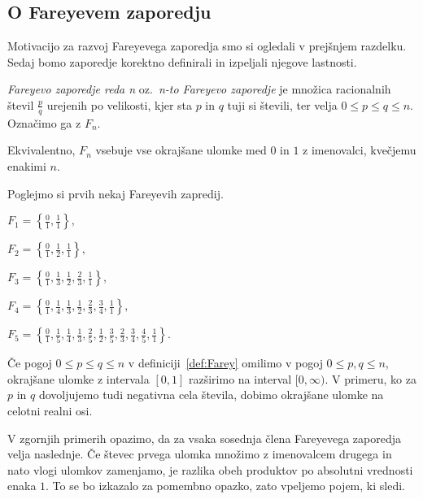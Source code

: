 \documentclass[mat1]{fmfdelo}
\begin{document}
%
\subsection{O Fareyevem zaporedju}

Motivacijo za razvoj Fareyevega zaporedja smo si ogledali v prejšnjem razdelku. Sedaj bomo zaporedje korektno definirali in izpeljali njegove lastnosti.

\begin{definicija}
\label{def:Farey}
\emph{Fareyevo zaporedje reda n} oz.\ \emph{n-to Fareyevo zaporedje} je množica racionalnih števil $\frac{p}{q}$ urejenih po velikosti, kjer sta $p$ in $q$ tuji si števili, ter velja $0 \leq p \leq q \leq n$. Označimo ga z $F_n$.

Ekvivalentno, $F_n$ vsebuje vse okrajšane ulomke med $0$ in $1$ z imenovalci, kvečjemu enakimi $n$.
\end{definicija}

\begin{primer}
Poglejmo si prvih nekaj Fareyevih zapredij.

\(F_1 = \left \{\frac{0}{1}, \frac{1}{1} \right \}, \)

\(F_2 = \left \{\frac{0}{1}, \frac{1}{2}, \frac{1}{1} \right \}, \)

\(F_3 = \left \{\frac{0}{1}, \frac{1}{3}, \frac{1}{2}, \frac{2}{3}, \frac{1}{1} \right \}, \)

\(F_4 = \left \{\frac{0}{1}, \frac{1}{4}, \frac{1}{3}, \frac{1}{2}, \frac{2}{3}, \frac{3}{4}, \frac{1}{1} \right \}, \)

\(F_5 = \left \{\frac{0}{1}, \frac{1}{5}, \frac{1}{4}, \frac{1}{3}, \frac{2}{5}, \frac{1}{2}, \frac{3}{5}, \frac{2}{3}, \frac{3}{4}, \frac{4}{5}, \frac{1}{1}\right \}. \)
\end{primer}

\begin{opomba}
Če pogoj $0 \leq p \leq q \leq n$ v definiciji~\ref{def:Farey} omilimo v pogoj $0 \leq p,q \leq n$, okrajšane ulomke z intervala $[0,1]$ razširimo na interval $[0, \infty)$. V primeru, ko za $p$ in $q$ dovoljujemo tudi negativna cela števila, dobimo okrajšane ulomke na celotni realni osi.
\end{opomba}

V zgornjih primerih opazimo, da za vsaka sosednja člena Fareyevega zaporedja velja naslednje. Če števec prvega ulomka množimo z imenovalcem drugega in nato vlogi ulomkov zamenjamo, je razlika obeh produktov po absolutni vrednosti enaka $1$. To se bo izkazalo za pomembno opazko, zato vpeljemo pojem, ki sledi.
\end{document}
